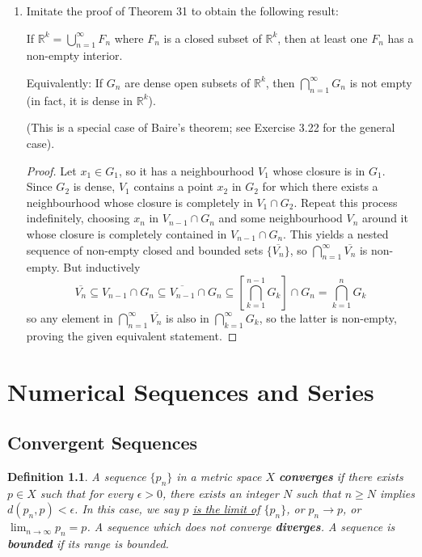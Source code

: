 \documentclass{scrbook}
\newcommand{\Q}{\mathbb{Q}}
\newcommand{\R}{\mathbb{R}}
\renewcommand{\to}{\rightarrow}
\renewcommand{\underline}{\ul}
\newtheorem{definition}{Definition}
\begin{document}
\begin{enumerate}
\begin{proof}
Now, if $(a, b)$ and $(c, d)$ share at least one point, then $c < b$ and $d > a$. Since $a, c \not\in A$, we must have $a \ge c$ and $c \ge a$, so $a = c$. Similarly $b = d$ so the intervals are the same. That is, if two intervals share any point, they must be the same interval. Now, every interval $I_x$ contains at least one rational since $\Q$ is dense, so there exists an injection from our set of open sets to the countable set of rational numbers. Thus, our set is countable, as required.
\end{proof}

\item %
Imitate the proof of Theorem 31 to obtain the following result:

If $\R^k = \bigcup_{n=1}^{\infty} F_n$ where $F_n$ is a closed subset of $\R^k$, then at least one $F_n$ has a non-empty interior.

Equivalently: If $G_n$ are dense open subsets of $\R^k$, then $\bigcap_{n=1}^{\infty} G_n$ is not empty (in fact, it is dense in $\R^k$).

(This is a special case of Baire's theorem; see Exercise 3.22 for the general case).

\begin{proof}
Let $x_1 \in G_1$, so it has a neighbourhood $V_1$ whose closure is in $G_1$. Since $G_2$ is dense, $V_1$ contains a point $x_2$ in $G_2$ for which there exists a neighbourhood whose closure is completely in $V_1 \cap G_2$. Repeat this process indefinitely, choosing $x_n$ in $V_{n-1} \cap G_n$ and some neighbourhood $V_n$ around it whose closure is completely contained in $V_{n-1} \cap G_n$. This yields a nested sequence of non-empty closed and bounded sets $\{\overline{V_n}\}$, so $\bigcap_{n=1}^{\infty} \overline{V_n}$ is non-empty. But inductively
\[
	\overline{V_n} \subseteq V_{n-1} \cap G_n \subseteq \overline{V_{n-1}} \cap G_n \subseteq \left[\bigcap_{k=1}^{n-1} G_k\right] \cap G_n = \bigcap_{k=1}^{n} G_k
\]
so any element in $\bigcap_{n=1}^{\infty} \overline{V_n}$ is also in $\bigcap_{k=1}^{\infty} G_k$, so the latter is non-empty, proving the given equivalent statement.
\end{proof}
\end{enumerate}

\chapter{Numerical Sequences and Series}

\section{Convergent Sequences}
\begin{definition}
A sequence $\{p_n\}$ in a metric space $X$ \textbf{converges} if there exists $p \in X$ such that for every $\epsilon > 0$, there exists an integer $N$ such that $n \ge N$ implies $d(p_n, p) < \epsilon$. In this case, we say $p$ \underline{is the limit of} $\{p_n\}$, or $p_n \to p$, or $\lim_{n \to \infty} p_n = p$. A sequence which does not converge \textbf{diverges}. A sequence is \textbf{bounded} if its range is bounded.
\end{definition}
\end{document}
